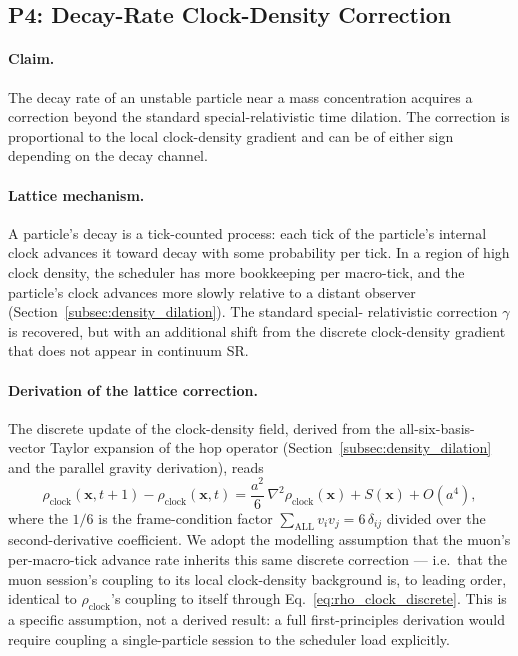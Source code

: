 \subsection{P4: Decay-Rate Clock-Density Correction}
\label{subsec:p4_decay_correction}

\paragraph{Claim.}
The decay rate of an unstable particle near a mass concentration
acquires a correction beyond the standard special-relativistic time
dilation. The correction is proportional to the local clock-density
gradient and can be of either sign depending on the decay channel.

\paragraph{Lattice mechanism.}
A particle's decay is a tick-counted process: each tick of the
particle's internal clock advances it toward decay with some
probability per tick. In a region of high clock density, the
scheduler has more bookkeeping per macro-tick, and the particle's
clock advances more slowly relative to a distant observer
(Section~\ref{subsec:density_dilation}). The standard special-
relativistic correction $\gamma$ is recovered, but with an
additional shift from the discrete clock-density gradient that does
not appear in continuum SR.

\paragraph{Derivation of the lattice correction.}
The discrete update of the clock-density field, derived from the
all-six-basis-vector Taylor expansion of the hop operator
(Section~\ref{subsec:density_dilation} and the parallel gravity
derivation), reads
\begin{equation}
    \rho_\text{clock}(\mathbf{x},t+1) - \rho_\text{clock}(\mathbf{x},t)
        = \frac{a^2}{6}\,\nabla^2 \rho_\text{clock}(\mathbf{x})
        + S(\mathbf{x}) + O(a^4),
    \label{eq:rho_clock_discrete}
\end{equation}
where the $1/6$ is the frame-condition factor $\sum_\text{ALL} v_i v_j = 6\,\delta_{ij}$
divided over the second-derivative coefficient.  We adopt the
modelling assumption that the muon's per-macro-tick advance rate
inherits this same discrete correction --- i.e.\ that the muon
session's coupling to its local clock-density background is, to
leading order, identical to $\rho_\text{clock}$'s coupling to itself
through Eq.~\eqref{eq:rho_clock_discrete}.  This is a specific
assumption, not a derived result: a full first-principles derivation
would require coupling a single-particle session to the scheduler
load explicitly.

